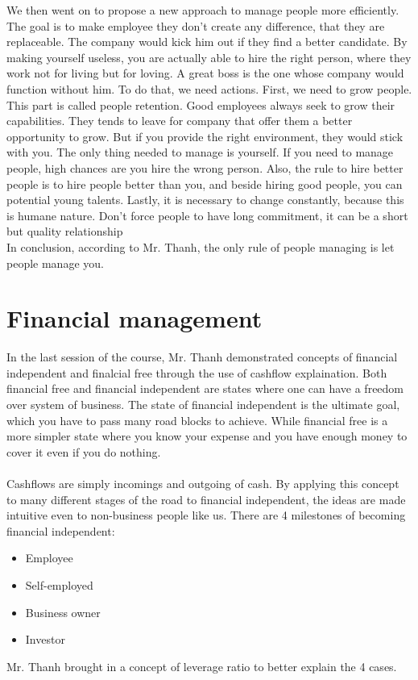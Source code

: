 \documentclass[a4paper, 11pt]{article} %
\begin{document}
We then went on to propose a new approach to manage people more efficiently. The goal is to make employee they don't create any difference, that they are replaceable. The company would kick him out if they find a better candidate. By making yourself useless, you are actually able to hire the right person, where they work not for living but for loving. A great boss is the one whose company would function without him. To do that, we need actions. First, we need to grow people. This part is called people retention. Good employees always seek to grow their capabilities. They tends to leave for company that offer them a better opportunity to grow. But if you provide the right environment, they would stick with you. The only thing needed to manage is yourself. If you need to manage people, high chances are you hire the wrong person. Also, the rule to hire better people is to hire people better than you, and beside hiring good people, you can potential young talents. Lastly, it is necessary to change constantly, because this is humane nature. Don't force people to have long commitment, it can be a short but quality relationship
\\In conclusion, according to Mr. Thanh, the only rule of people managing is let people manage you. 
\section*{Financial management}
In the last session of the course, Mr. Thanh demonstrated concepts of financial independent and finalcial free through the use of cashflow explaination. Both financial free and financial independent are states where one can have a freedom over system of business. The state of financial independent is the ultimate goal, which you have to pass many road blocks to achieve. While financial free is a more simpler state where you know your expense and you have enough money to cover it even if you do nothing.
\\
\\
Cashflows are simply incomings and outgoing of cash. By applying this concept to many different stages of the road to financial independent, the ideas are made intuitive even to non-business people like us. There are 4 milestones of becoming financial independent:
\begin{itemize}
\item{Employee}
\item{Self-employed}
\item{Business owner}
\item{Investor}
\end{itemize}
Mr. Thanh brought in a concept of leverage ratio to better explain the 4 cases.
\end{document}
